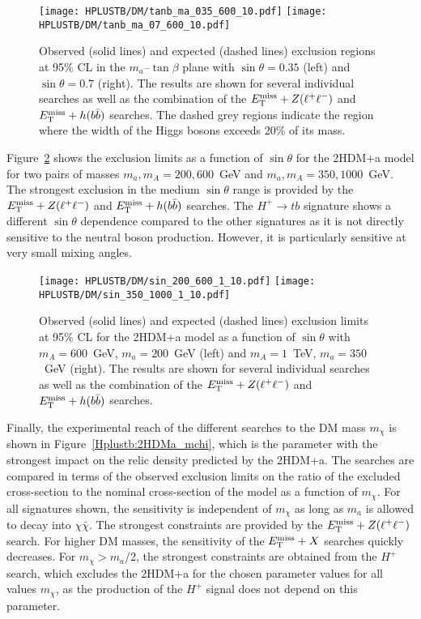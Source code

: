 \begin{figure}[htb]
    \RawFloats
    \centering
    \texttt{[image: HPLUSTB/DM/tanb\_ma\_035\_600\_10.pdf]}
    \texttt{[image: HPLUSTB/DM/tanb\_ma\_07\_600\_10.pdf]}
    \caption{Observed (solid lines) and expected (dashed lines) exclusion regions at 95\% CL in the $m_a$--$\tan\beta$ plane with $\sin\theta=0.35$ (left) and $\sin\theta=0.7$ (right). The results are shown for several individual searches as well as the combination of the $E_{\text{T}}^{\text{miss}}+Z(\ell^+\ell^-)$ and $E_{\text{T}}^{\text{miss}}+h(b\bar{b})$ searches. The dashed grey regions indicate the region where the width of the Higgs bosons exceeds 20\% of its mass.}
    \label{Hplustb:2HDMa_tanb_ma}
\end{figure}

Figure~\ref{Hplustb:2HDMa_sintheta} shows the exclusion limits as a function of $\sin\theta$ for the 2HDM+a model for two pairs of masses $m_a,m_A = 200, 600$~GeV and $m_a,m_A=350,1000$~GeV. The strongest exclusion in the medium $\sin\theta$ range is provided by the $E_{\text{T}}^{\text{miss}}+ Z(\ell^+\ell^-)$ and $E_{\text{T}}^{\text{miss}}+ h(b\bar{b})$ searches. The $H^+\to tb$ signature shows a different $\sin\theta$ dependence compared to the other signatures as it is not directly sensitive to the neutral boson production. However, it is particularly sensitive at very small mixing angles.\\

\begin{figure}[htb]
    \RawFloats
    \centering
    \texttt{[image: HPLUSTB/DM/sin\_200\_600\_1\_10.pdf]}
    \texttt{[image: HPLUSTB/DM/sin\_350\_1000\_1\_10.pdf]}
    \caption{Observed (solid lines) and expected (dashed lines) exclusion limits at 95\% CL for the 2HDM+a model as a function of $\sin\theta$ with $m_A = 600$~GeV, $m_a = 200$~GeV (left) and $m_A = 1$~TeV, $m_a = 350$~GeV (right). The results are shown for several individual searches as well as the combination of the $E_{\text{T}}^{\text{miss}}+Z(\ell^+\ell^-)$ and $E_{\text{T}}^{\text{miss}}+h(b\bar{b})$ searches.}
    \label{Hplustb:2HDMa_sintheta}
\end{figure}

Finally, the experimental reach of the different searches to the DM mass $m_\chi$ is shown in Figure~\ref{Hplustb:2HDMa_mchi}, which is the parameter with the strongest impact on the relic density predicted by the 2HDM+a. The searches are compared in terms of the observed exclusion limits on the ratio of the excluded cross-section to the nominal cross-section of the model as a function of $m_\chi$. For all signatures shown, the sensitivity is independent of $m_\chi$ as long as $m_a$ is allowed to decay into $\chi\bar{\chi}$. The strongest constraints are provided by the $E_{\text{T}}^{\text{miss}}+ Z(\ell^+\ell^-)$ search. For higher DM masses, the sensitivity of the $E_{\text{T}}^{\text{miss}}+X$ searches quickly decreases. For $m_\chi>m_a$/2, the strongest constraints are obtained from the $H^+$ search, which excludes the 2HDM+a for the chosen parameter values for all values $m_\chi$, as the production of the $H^+$ signal does not depend on this parameter.\\


